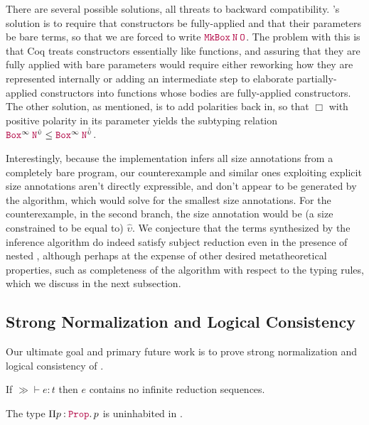 There are several possible solutions, all threats to backward compatibility.
\CIChat's solution is to require that constructors be fully-applied and that their parameters be bare terms,
so that we are forced to write $\app{\MkBox}{\nat}{\Zero}$.
The problem with this is that Coq treats constructors essentially like functions,
and assuring that they are fully applied with bare parameters would require either reworking how they are represented internally
or adding an intermediate step to elaborate partially-applied constructors into functions whose bodies are fully-applied constructors.
The other solution, as mentioned, is to add polarities back in, so that $\Box$ with positive polarity in its parameter yields the subtyping relation $\app{\Box^\infty}{\nat^{\hat{\upsilon}}} \leq \app{\Box^\infty}{\nat^{\hat{\hat{\upsilon}}}}$.

Interestingly, because the implementation infers all size annotations from a completely bare program,
our counterexample and similar ones exploiting explicit size annotations aren't directly expressible,
and don't appear to be generated by the algorithm, which would solve for the smallest size annotations.
For the counterexample, in the second branch, the size annotation would be (a size constrained to be equal to) $\hat{\upsilon}$.
We conjecture that the terms synthesized by the inference algorithm do indeed satisfy subject reduction even in the presence of nested \coinductives,
although perhaps at the expense of other desired metatheoretical properties,
such as completeness of the algorithm with respect to the typing rules,
which we discuss in the next subsection.

\subsection{Strong Normalization and Logical Consistency}

Our ultimate goal and primary future work is to prove strong normalization and logical consistency of \lang.

\begin{conjecture}\label{thm:metatheory:sn}
  If $\gg \vdash e : t$ then $e$ contains no infinite
  reduction sequences.
\end{conjecture}

\begin{conjecture}\label{thm:metatheory:lc}
  The type $\prod{p}{\Prop}{p}$ is uninhabited in \lang.
\end{conjecture}


